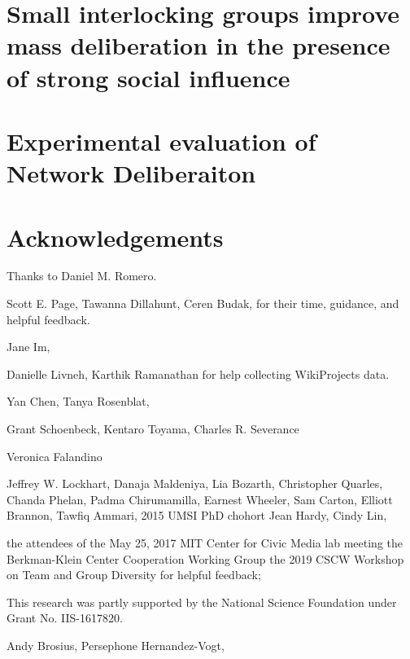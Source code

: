 \documentclass{report}
\newcommand{\+}{\phantom{-}}
\begin{document}
\chapter{Small interlocking groups improve mass deliberation in the presence
of strong social influence}

\chapter{Experimental evaluation of Network Deliberaiton}

\chapter*{Acknowledgements}
Thanks to Daniel M. Romero.


Scott E. Page,
Tawanna Dillahunt,
Ceren Budak,
for their time, guidance, and helpful feedback.

Jane Im,

Danielle Livneh,
Karthik Ramanathan
for help collecting WikiProjects data.

Yan Chen,
Tanya Rosenblat,

Grant Schoenbeck,
Kentaro Toyama,
Charles R. Severance

Veronica Falandino

Jeffrey W. Lockhart,
Danaja Maldeniya,
Lia Bozarth,
Christopher Quarles,
Chanda Phelan,
Padma Chirumamilla,
Earnest Wheeler,
Sam Carton,
Elliott Brannon,
Tawfiq Ammari,
2015 UMSI PhD chohort
Jean Hardy,
Cindy Lin,

the attendees of the May 25, 2017 MIT Center for Civic Media lab meeting
the Berkman-Klein Center Cooperation Working Group
the 2019 CSCW Workshop on Team and Group Diversity
for helpful feedback;

This research was partly supported by
the National Science Foundation under Grant No. IIS-1617820.

Andy Brosius,
Persephone Hernandez-Vogt,


\nocite{*}


\end{document}
